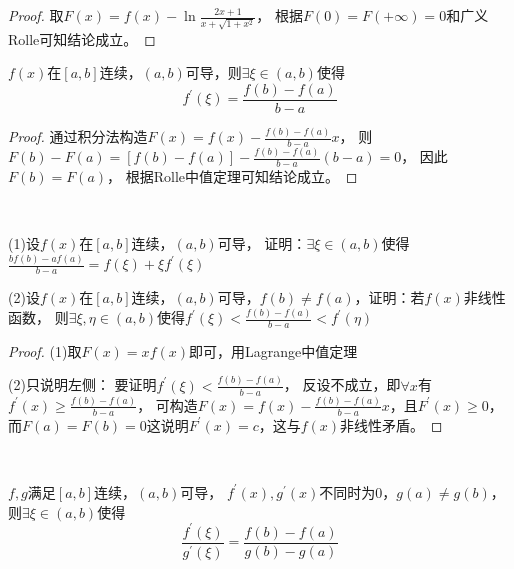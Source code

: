 \begin{proof}
  取$F(x) = f(x) - \ln \frac{2x + 1}{x + \sqrt{1 + x^2}}$，
  根据$F(0) = F(+\infty) = 0$和广义Rolle可知结论成立。
\end{proof}

\begin{theorem}[Lagrange中值定理]
  $f(x)$在$[a,b]$连续，$(a,b)$可导，则$\exists \xi \in (a,b)$使得
  \begin{equation*}
    f^{\prime}(\xi) = \frac{f(b) - f(a)}{b - a}
  \end{equation*}
\end{theorem}

\begin{proof}
  通过积分法构造$F(x) = f(x) - \frac{f(b) - f(a)}{b - a}x$，
  则$F(b) - F(a) = [f(b) - f(a)] - \frac{f(b) - f(a)}{b - a}(b - a) = 0$，
  因此$F(b) = F(a)$，
  根据Rolle中值定理可知结论成立。
\end{proof}

~

\begin{exercise}[Lagrange中值定理基本应用]
  (1)设$f(x)$在$[a,b]$连续，$(a,b)$可导，
  证明：$\exists \xi \in (a,b)$使得$\frac{bf(b) - af(a)}{b - a} = f(\xi) + \xi f^{\prime}(\xi)$

  (2)设$f(x)$在$[a,b]$连续，$(a,b)$可导，$f(b) \neq f(a)$，证明：若$f(x)$非线性函数，
  则$\exists \xi, \eta \in (a,b)$使得$f^{\prime}(\xi) < \frac{f(b) - f(a)}{b - a} < f^{\prime}(\eta)$
\end{exercise}

\begin{proof}
  (1)取$F(x) = xf(x)$即可，用Lagrange中值定理

  (2)只说明左侧：
  要证明$f^{\prime}(\xi) < \frac{f(b) - f(a)}{b - a}$，
  反设不成立，即$\forall x$有$f^{\prime}(x) \geq \frac{f(b) - f(a)}{b - a}$，
  可构造$F(x) = f(x) - \frac{f(b) - f(a)}{b - a}x$，且$F^{\prime}(x) \geq 0$，
  而$F(a) = F(b) = 0$这说明$F^{\prime}(x) = c$，这与$f(x)$非线性矛盾。
\end{proof}

~

\begin{theorem}[Cauchy中值定理]
  $f,g$满足$[a,b]$连续，$(a,b)$可导，
  $f^{\prime}(x),g^{\prime}(x)$不同时为$0$，$g(a) \neq g(b)$，
  则$\exists \xi \in (a,b)$使得
  \begin{equation*}
    \frac{f^{\prime}(\xi)}{g^{\prime}(\xi)} = \frac{f(b) - f(a)}{g(b) - g(a)}
  \end{equation*}
\end{theorem}

